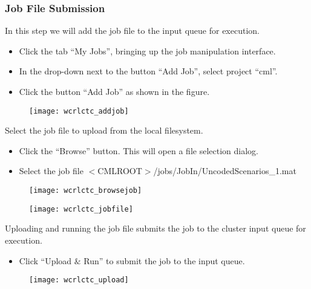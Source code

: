 \begin{frame}
  \frametitle{Job File Submission}

  In this step we will add the job file to the input queue for execution.
  \begin{itemize}
  \item Click the tab ``My Jobs'', bringing up the job manipulation interface.
  \item In the drop-down next to the button ``Add Job'', select project ``cml''.
  \item Click the button ``Add Job'' as shown in the figure.
  \end{itemize}

  \centering

  \begin{figure}
    \texttt{[image: wcrlctc\_addjob]}
  \end{figure}

\end{frame}




\begin{frame}

  Select the job file to upload from the local filesystem.
  \begin{itemize}
  \item Click the ``Browse'' button. This will open a file selection dialog.
  \item Select the job file $<$CMLROOT$>$/jobs/JobIn/UncodedScenarios\_1.mat
  \end{itemize}

  \centering
  \begin{figure}
    \texttt{[image: wcrlctc\_browsejob]}
  \end{figure}

  \vspace{-8mm}

  \begin{figure}
    \texttt{[image: wcrlctc\_jobfile]}
  \end{figure}

\end{frame}




\begin{frame}

  Uploading and running the job file submits the job to the cluster input queue for execution.
  \begin{itemize}
  \item Click ``Upload $\&$ Run'' to submit the job to the input queue.
  \end{itemize}

  \centering
  \begin{figure}
    \texttt{[image: wcrlctc\_upload]}
  \end{figure}

\end{frame}




